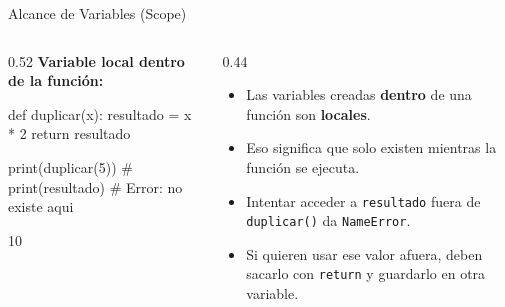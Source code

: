 \documentclass[aspectratio=169, 11pt]{beamer}
\begin{document}
\begin{frame}[fragile,shrink=28]{Alcance de Variables (Scope)}
  \vspace{-6pt}
  \begin{columns}[T]
    \begin{column}{0.52\textwidth}
      {\footnotesize\color{arcaDark}\bfseries Variable local dentro de la función:}
      \vspace{2pt}
      \begin{pyblock}
def duplicar(x):
    resultado = x * 2
    return resultado

print(duplicar(5))
# print(resultado)  # Error: no existe aqui
      \end{pyblock}
      \vspace{-2pt}
      \begin{outputblock}
10
      \end{outputblock}
    \end{column}

    \begin{column}{0.44\textwidth}
      \vspace{2pt}
      {\scriptsize\color{textMuted}
      \begin{itemize}\setlength{\itemsep}{4pt}
        \item[{\color{arcaRed}\scriptsize\faArrowRight}]
          Las variables creadas \textbf{dentro}
          de una función son \textbf{locales}.
        \item[{\color{arcaRed}\scriptsize\faArrowRight}]
          Eso significa que solo existen mientras
          la función se ejecuta.
        \item[{\color{arcaRed}\scriptsize\faExclamationTriangle}]
          Intentar acceder a \texttt{resultado}
          fuera de \texttt{duplicar()} da
          \texttt{NameError}.
        \item[{\color{arcaRed}\scriptsize\faLightbulb}]
          Si quieren usar ese valor afuera,
          deben sacarlo con \texttt{return}
          y guardarlo en otra variable.
      \end{itemize}
      }
    \end{column}
  \end{columns}
\end{frame}
\end{document}
